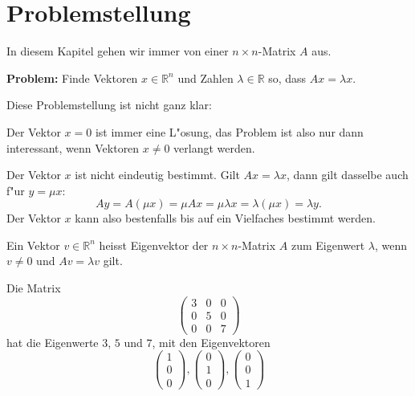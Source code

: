 \section{Problemstellung}
In diesem Kapitel gehen wir immer von einer $n\times n$-Matrix $A$ aus.

\medskip
{\parindent0pt \bf Problem:} Finde Vektoren $x\in\mathbb R^n$ und
Zahlen $\lambda\in\mathbb R$ so, dass $Ax=\lambda x$.
\medskip

{\parindent0pt Diese Problemstellung ist nicht ganz klar:}
\begin{compactitem}
\item Der Vektor $x=0$ ist immer eine L"osung, das Problem ist also
nur dann interessant, wenn Vektoren $x\ne 0$ verlangt werden.
\item Der Vektor $x$ ist nicht eindeutig bestimmt.
Gilt $Ax=\lambda x$, dann gilt dasselbe auch f"ur $y=\mu x$:
\[
Ay= A(\mu x)=\mu Ax=\mu\lambda x = \lambda (\mu x)=\lambda y.
\]
Der Vektor $x$ kann also bestenfalls bis auf ein Vielfaches bestimmt werden.
\end{compactitem}

\begin{definition}
Ein Vektor $v \in \mathbb R^n$ heisst Eigenvektor der $n\times n$-Matrix $A$
zum Eigenwert $\lambda$, wenn $v\ne 0$ und $Av=\lambda v$ gilt.
\end{definition}

\begin{beispiel}
Die Matrix
\[
\begin{pmatrix}
3&0&0\\
0&5&0\\
0&0&7
\end{pmatrix}
\]
hat die Eigenwerte $3$, $5$ und $7$, mit den Eigenvektoren
\[
\begin{pmatrix}
1\\0\\0
\end{pmatrix}
,
\begin{pmatrix}
0\\1\\0
\end{pmatrix}
,
\begin{pmatrix}
0\\0\\1
\end{pmatrix}
\]
\end{beispiel}

